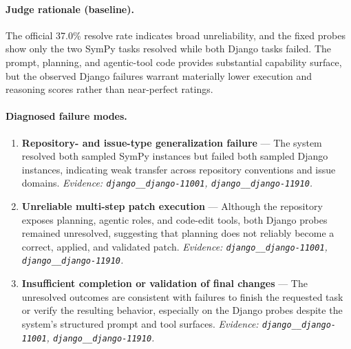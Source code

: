 \paragraph{Judge rationale (baseline).}
The official 37.0\% resolve rate indicates broad unreliability, and the fixed probes show only the two SymPy tasks resolved while both Django tasks failed. The prompt, planning, and agentic-tool code provides substantial capability surface, but the observed Django failures warrant materially lower execution and reasoning scores rather than near-perfect ratings.
\paragraph{Diagnosed failure modes.}\begin{enumerate}\itemsep1pt
\item \textbf{Repository- and issue-type generalization failure} --- The system resolved both sampled SymPy instances but failed both sampled Django instances, indicating weak transfer across repository conventions and issue domains. \emph{Evidence: \texttt{django\_\_django-11001}, \texttt{django\_\_django-11910}.}
\item \textbf{Unreliable multi-step patch execution} --- Although the repository exposes planning, agentic roles, and code-edit tools, both Django probes remained unresolved, suggesting that planning does not reliably become a correct, applied, and validated patch. \emph{Evidence: \texttt{django\_\_django-11001}, \texttt{django\_\_django-11910}.}
\item \textbf{Insufficient completion or validation of final changes} --- The unresolved outcomes are consistent with failures to finish the requested task or verify the resulting behavior, especially on the Django probes despite the system's structured prompt and tool surfaces. \emph{Evidence: \texttt{django\_\_django-11001}, \texttt{django\_\_django-11910}.}
\end{enumerate}
